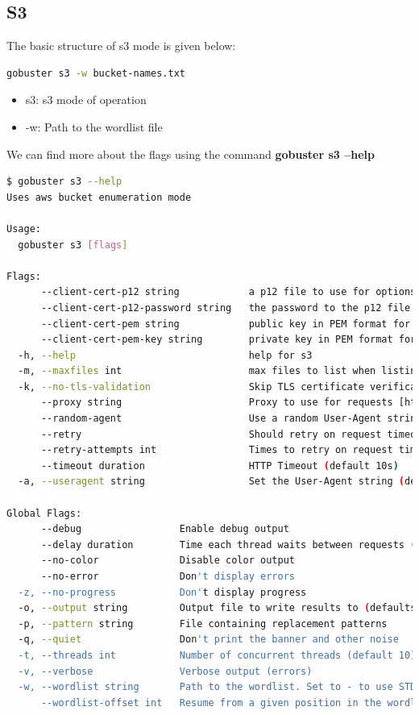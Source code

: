 \documentclass[12 pt]{article}
\begin{document}
\subsection{S3}
The basic structure of s3 mode is given below:
\begin{lstlisting}[language=bash]
gobuster s3 -w bucket-names.txt
\end{lstlisting}
\begin{itemize}
    \item s3: s3 mode of operation
    \item -w: Path to the wordlist file 
\end{itemize}
We can find more about the flags using the command \textbf{gobuster s3 --help}
\begin{lstlisting}[language=bash]
$ gobuster s3 --help 
Uses aws bucket enumeration mode

Usage:
  gobuster s3 [flags]

Flags:
      --client-cert-p12 string            a p12 file to use for options TLS client certificates
      --client-cert-p12-password string   the password to the p12 file
      --client-cert-pem string            public key in PEM format for optional TLS client certificates
      --client-cert-pem-key string        private key in PEM format for optional TLS client certificates (this key needs to have no password)
  -h, --help                              help for s3
  -m, --maxfiles int                      max files to list when listing buckets (only shown in verbose mode) (default 5)
  -k, --no-tls-validation                 Skip TLS certificate verification
      --proxy string                      Proxy to use for requests [http(s)://host:port] or [socks5://host:port]
      --random-agent                      Use a random User-Agent string
      --retry                             Should retry on request timeout
      --retry-attempts int                Times to retry on request timeout (default 3)
      --timeout duration                  HTTP Timeout (default 10s)
  -a, --useragent string                  Set the User-Agent string (default "gobuster/3.6")

Global Flags:
      --debug                 Enable debug output
      --delay duration        Time each thread waits between requests (e.g. 1500ms)
      --no-color              Disable color output
      --no-error              Don't display errors
  -z, --no-progress           Don't display progress
  -o, --output string         Output file to write results to (defaults to stdout)
  -p, --pattern string        File containing replacement patterns
  -q, --quiet                 Don't print the banner and other noise
  -t, --threads int           Number of concurrent threads (default 10)
  -v, --verbose               Verbose output (errors)
  -w, --wordlist string       Path to the wordlist. Set to - to use STDIN.
      --wordlist-offset int   Resume from a given position in the wordlist (defaults to 0)
\end{lstlisting}
\end{document}
